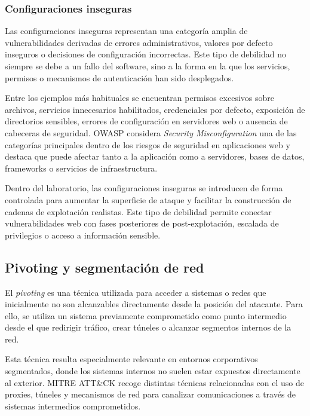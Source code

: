 
\subsubsection{Configuraciones inseguras}

Las configuraciones inseguras representan una categoría amplia de vulnerabilidades derivadas de errores administrativos, valores por defecto inseguros o decisiones de configuración incorrectas. Este tipo de debilidad no siempre se debe a un fallo del software, sino a la forma en la que los servicios, permisos o mecanismos de autenticación han sido desplegados.

Entre los ejemplos más habituales se encuentran permisos excesivos sobre archivos, servicios innecesarios habilitados, credenciales por defecto, exposición de directorios sensibles, errores de configuración en servidores web o ausencia de cabeceras de seguridad. OWASP considera \textit{Security Misconfiguration} una de las categorías principales dentro de los riesgos de seguridad en aplicaciones web y destaca que puede afectar tanto a la aplicación como a servidores, bases de datos, frameworks o servicios de infraestructura.

Dentro del laboratorio, las configuraciones inseguras se introducen de forma controlada para aumentar la superficie de ataque y facilitar la construcción de cadenas de explotación realistas. Este tipo de debilidad permite conectar vulnerabilidades web con fases posteriores de post-explotación, escalada de privilegios o acceso a información sensible.


\subsection{Pivoting y segmentación de red}

El \textit{pivoting} es una técnica utilizada para acceder a sistemas o redes que inicialmente no son alcanzables directamente desde la posición del atacante. Para ello, se utiliza un sistema previamente comprometido como punto intermedio desde el que redirigir tráfico, crear túneles o alcanzar segmentos internos de la red.

Esta técnica resulta especialmente relevante en entornos corporativos segmentados, donde los sistemas internos no suelen estar expuestos directamente al exterior. MITRE ATT\&CK recoge distintas técnicas relacionadas con el uso de proxies, túneles y mecanismos de red para canalizar comunicaciones a través de sistemas intermedios comprometidos.

